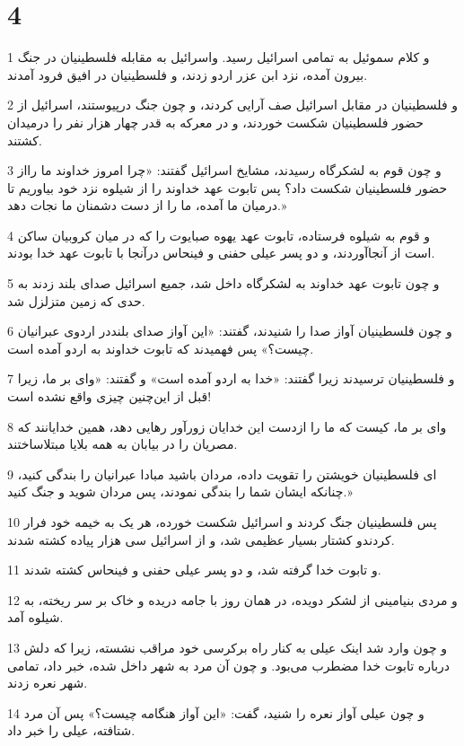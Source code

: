 \chapter{4}

\par 1 و کلام سموئیل به تمامی اسرائیل رسید. واسرائیل به مقابله فلسطینیان در جنگ بیرون آمده، نزد ابن عزر اردو زدند، و فلسطینیان در افیق فرود آمدند.
\par 2 و فلسطینیان در مقابل اسرائیل صف آرایی کردند، و چون جنگ درپیوستند، اسرائیل از حضور فلسطینیان شکست خوردند، و در معرکه به قدر چهار هزار نفر را درمیدان کشتند.
\par 3 و چون قوم به لشکرگاه رسیدند، مشایخ اسرائیل گفتند: «چرا امروز خداوند ما رااز حضور فلسطینیان شکست داد؟ پس تابوت عهد خداوند را از شیلوه نزد خود بیاوریم تا درمیان ما آمده، ما را از دست دشمنان ما نجات دهد.»
\par 4 و قوم به شیلوه فرستاده، تابوت عهد یهوه صبایوت را که در میان کروبیان ساکن است از آنجاآوردند، و دو پسر عیلی حفنی و فینحاس درآنجا با تابوت عهد خدا بودند.
\par 5 و چون تابوت عهد خداوند به لشکرگاه داخل شد، جمیع اسرائیل صدای بلند زدند به حدی که زمین متزلزل شد.
\par 6 و چون فلسطینیان آواز صدا را شنیدند، گفتند: «این آواز صدای بلنددر اردوی عبرانیان چیست؟» پس فهمیدند که تابوت خداوند به اردو آمده است.
\par 7 و فلسطینیان ترسیدند زیرا گفتند: «خدا به اردو آمده است» و گفتند: «وای بر ما، زیرا قبل از این‌چنین چیزی واقع نشده است!
\par 8 وای بر ما، کیست که ما را ازدست این خدایان زورآور رهایی دهد، همین خدایانند که مصریان را در بیابان به همه بلایا مبتلاساختند.
\par 9 ‌ای فلسطینیان خویشتن را تقویت داده، مردان باشید مبادا عبرانیان را بندگی کنید، چنانکه ایشان شما را بندگی نمودند، پس مردان شوید و جنگ کنید.»
\par 10 پس فلسطینیان جنگ کردند و اسرائیل شکست خورده، هر یک به خیمه خود فرار کردندو کشتار بسیار عظیمی شد، و از اسرائیل سی هزار پیاده کشته شدند.
\par 11 و تابوت خدا گرفته شد، و دو پسر عیلی حفنی و فینحاس کشته شدند.
\par 12 و مردی بنیامینی از لشکر دویده، در همان روز با جامه دریده و خاک بر سر ریخته، به شیلوه آمد.
\par 13 و چون وارد شد اینک عیلی به کنار راه برکرسی خود مراقب نشسته، زیرا که دلش درباره تابوت خدا مضطرب می‌بود. و چون آن مرد به شهر داخل شده، خبر داد، تمامی شهر نعره زدند.
\par 14 و چون عیلی آواز نعره را شنید، گفت: «این آواز هنگامه چیست؟» پس آن مرد شتافته، عیلی را خبر داد.
